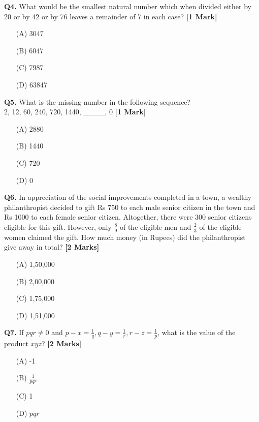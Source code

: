 \documentclass[11pt]{article}
\newcommand{\questiona}[2]{
    \noindent\textbf{Q#2.} #1 \hfill \textbf{[1 Mark]}
}
\newcommand{\questionb}[2]{
    \noindent\textbf{Q#2.} #1 \hfill \textbf{[2 Marks]}
}
\begin{document}
\questiona{What would be the smallest natural number which when divided either by 20 or by 42 or by 76 leaves a remainder of 7 in each case?}{4}
\begin{enumerate}
    \item[(A)] 3047
    \item[(B)] 6047
    \item[(C)] 7987
    \item[(D)] 63847
\end{enumerate}
\vspace{0.5cm}

\questiona{What is the missing number in the following sequence?\\
2, 12, 60, 240, 720, 1440, \_\_\_\_, 0}{5}
\begin{enumerate}
    \item[(A)] 2880
    \item[(B)] 1440
    \item[(C)] 720
    \item[(D)] 0
\end{enumerate}
\vspace{0.5cm}

\questionb{In appreciation of the social improvements completed in a town, a wealthy philanthropist decided to gift Rs 750 to each male senior citizen in the town and Rs 1000 to each female senior citizen. Altogether, there were 300 senior citizens eligible for this gift. However, only \( \frac{8}{9} \) of the eligible men and \( \frac{2}{3} \) of the eligible women claimed the gift. How much money (in Rupees) did the philanthropist give away in total?}{6}
\begin{enumerate}
    \item[(A)] 1,50,000
    \item[(B)] 2,00,000
    \item[(C)] 1,75,000
    \item[(D)] 1,51,000
\end{enumerate}
\vspace{0.5cm}

\questionb{If \( pqr \neq 0 \) and \( p - x = \frac{1}{q}, q - y = \frac{1}{r}, r - z = \frac{1}{p} \), what is the value of the product \( xyz \)?}{7}
\begin{enumerate}
    \item[(A)] -1
    \item[(B)] \( \frac{1}{pqr} \)
    \item[(C)] 1
    \item[(D)] \( pqr \)
\end{enumerate}
\vspace{0.5cm}
\end{document}
